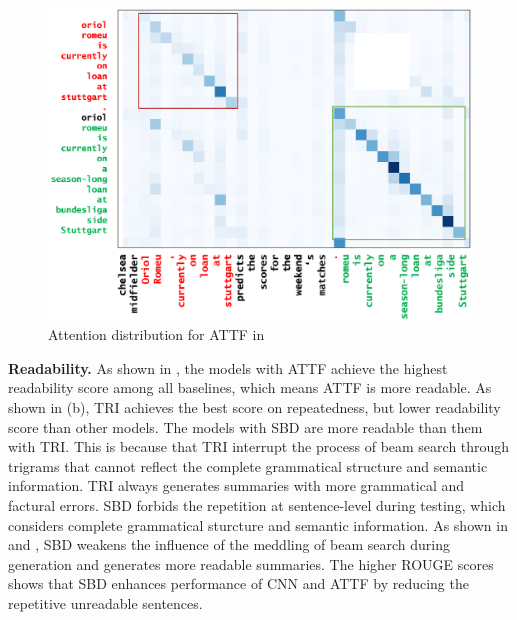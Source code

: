 \begin{figure}[th!]
\centering
\includegraphics[width=0.84\columnwidth]{map3}
\caption{Attention distribution for ATTF in }
\label{fig:attn_map3}
\end{figure}
	
\textbf{Readability.}
As shown in , 
the models with ATTF achieve the
highest readability score among all baselines, 
which means ATTF is more readable.
As shown in (b),
TRI achieves the best score on repeatedness, 
but lower readability score than other models.
The models with SBD are more readable than them with TRI. 
This is because that TRI interrupt the process of beam search through trigrams that cannot reflect the complete grammatical structure and semantic information. 
TRI always generates summaries with more grammatical and factural errors. 
SBD forbids the repetition at sentence-level during testing, which considers complete grammatical sturcture and semantic information.
As shown in  and , SBD weakens the influence of the meddling of beam search during generation
and generates more readable summaries.
The higher ROUGE scores shows that SBD enhances performance of CNN and ATTF by reducing the repetitive unreadable sentences. 

